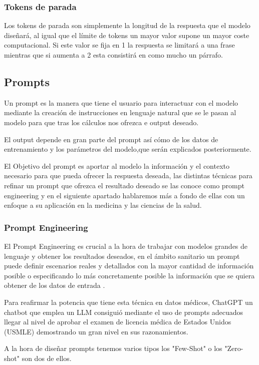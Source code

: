 \subsubsection{Tokens de parada}

Los tokens de parada son simplemente la longitud de la respuesta que el modelo diseñará, al igual que el límite de tokens un mayor valor supone un mayor coste computacional. Si este valor se fija en 1 la respuesta se limitará a una frase mientras que si aumenta a 2 esta consistirá en como mucho un párrafo.

\subsection{Prompts}
Un prompt es la manera que tiene el usuario para interactuar con el modelo mediante la creación de instrucciones en lenguaje natural que se le pasan al modelo para que tras los cálculos nos ofrezca e output deseado.

El output depende en gran parte del prompt así cómo de los datos de entrenamiento y los parámetros del modelo,que serán explicados posteriormente.

El Objetivo del prompt es aportar al modelo la información y el contexto necesario para que pueda ofrecer la respuesta deseada, las distintas técnicas para refinar un prompt que ofrezca el resultado deseado se las conoce como prompt engineering y en el siguiente apartado hablaremos más a fondo de ellas con un enfoque a su aplicación en la medicina y las ciencias de la salud.

\subsubsection{Prompt Engineering}

El Prompt Engineering es crucial a la hora de trabajar con modelos grandes de lenguaje y obtener los resultados deseados, en el ámbito sanitario un prompt puede definir escenarios reales y detallados con la mayor cantidad de información posible o especificando lo más concretamente posible la información que se quiera obtener de los datos de entrada .

Para reafirmar la potencia que tiene esta técnica en datos médicos, ChatGPT un chatbot que emplea un LLM consiguió mediante el uso de prompts adecuados llegar al nivel de aprobar el examen de licencia médica de Estados Unidos (USMLE) demostrando un gran nivel en sus razonamientos.

A la hora de diseñar prompts tenemos varios tipos los "Few-Shot" o los "Zero-shot" son dos de ellos. 


